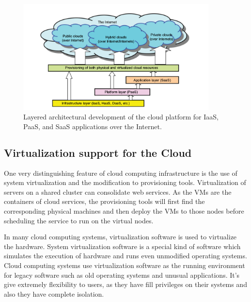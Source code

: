 \documentclass[12pt]{report}
\begin{document}
\begin{figure}[ht]
		\centering
           \includegraphics[width=0.9\textwidth]{cloudlayers.png}
         \caption{Layered architectural development of the cloud platform for IaaS, PaaS, and SaaS applications over the
Internet.}
         \label{cloudlayers}
\end{figure} 

\subsection*{Virtualization support for the Cloud}
One very distinguishing feature of cloud computing infrastructure is the use of system virtualization and the modification to provisioning tools. Virtualization of servers on a shared cluster can consolidate web services. As the VMs are the containers of cloud services, the provisioning tools will first find the corresponding physical machines and then deploy the VMs to those nodes before scheduling the service to run on the virtual nodes.

In many cloud computing systems, virtualization software is used to virtualize the hardware. System virtualization software is a special kind of software which simulates the execution of hardware and runs even unmodified operating systems. Cloud computing systems use virtualization software as the running environment for legacy software such as old operating systems and unusual applications. It's give extremely flexibility to users, as they have fill privileges on their systems and also they have complete isolation.
\end{document}
